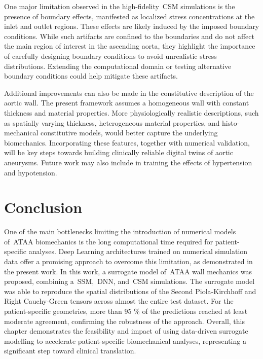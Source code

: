 \documentclass[a4paper,fleqn]{cas-sc}
\begin{document}
One major limitation observed in the high-fidelity~\gls{CSM} simulations is the presence of boundary effects, manifested as localized stress concentrations at the inlet and outlet regions. These effects are likely induced by the imposed boundary conditions. While such artifacts are confined to the boundaries and do not affect the main region of interest in the ascending aorta, they highlight the importance of carefully designing boundary conditions to avoid unrealistic stress distributions. Extending the computational domain or testing alternative boundary conditions could help mitigate these artifacts.

Additional improvements can also be made in the constitutive description of the aortic wall. The present framework assumes a homogeneous wall with constant thickness and material properties. More physiologically realistic descriptions, such as spatially varying thickness, heterogeneous material properties, and histo-mechanical constitutive models, would better capture the underlying biomechanics. Incorporating these features, together with numerical validation, will be key steps towards building clinically reliable digital twins of aortic aneurysms. Future work may also include in training the effects of hypertension and hypotension.

\section{Conclusion} \label{sec:conclusion}
One of the main bottlenecks limiting the introduction of numerical models of~\gls{ATAA} biomechanics is the long computational time required for patient-specific analyses. Deep Learning architectures trained on numerical simulation data offer a promising approach to overcome this limitation, as demonstrated in the present work. In this work, a surrogate model of~\gls{ATAA} wall mechanics was proposed, combining a~\gls{SSM},~\gls{DNN}, and~\gls{CSM} simulations. The surrogate model was able to reproduce the spatial distributions of the Second Piola-Kirchhoff and Right Cauchy-Green tensors across almost the entire test dataset. For the patient-specific geometries, more than 95 \% of the predictions reached at least moderate agreement, confirming the robustness of the approach. Overall, this chapter demonstrates the feasibility and impact of using data-driven surrogate modelling to accelerate patient-specific biomechanical analyses, representing a significant step toward clinical translation.
\end{document}
